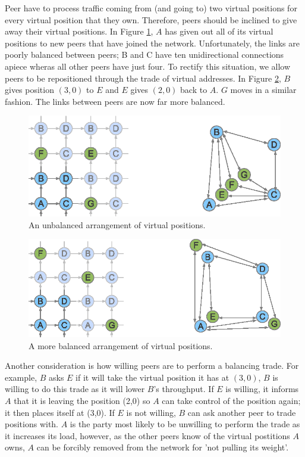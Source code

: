 \documentclass[ %
                    author={Luke Murray},
                supervisor={Dr. Simon Hollis},
                     title={Shadow Peer-to-Peer Networks},
                  subtitle={},
                    degree={MEng},
                      year={2013} ]{thesis}
\begin{document}
Peer have to process traffic coming from (and going to) two virtual positions for every virtual position that they own. Therefore, peers should be inclined to give away their virtual positions. In Figure \ref{balance1}, $A$ has given out all of its virtual positions to new peers that have joined the network. Unfortunately, the links are poorly balanced between peers; B and C have ten unidirectional connections apiece wheras all other peers have just four. To rectify this situation, we allow peers to be repositioned through the trade of virtual addresses. In Figure \ref{balance2}, $B$ gives position $(3,0)$ to $E$ and $E$ gives $(2,0)$ back to $A$. $G$ moves in a similar fashion. The links between peers are now far more balanced. 

\begin{figure}[h]
    \centering
    \includegraphics{diagrams/network_balance1.eps}
    \caption{An unbalanced arrangement of virtual positions.}
    \label{balance1}
\end{figure}
\begin{figure}[h]
    \centering
    \includegraphics{diagrams/network_balance2.eps}
    \caption{A more balanced arrangement of virtual positions.}
    \label{balance2}
\end{figure}

Another consideration is how willing peers are to perform a balancing trade. For example, $B$ asks $E$ if it will take the virtual position it has at $(3,0)$, $B$ is willing to do this trade as it will lower $B$'s throughput. If $E$ is willing, it informs $A$ that it is leaving the position (2,0) so $A$ can take control of the position again; it then places itself at (3,0). If $E$ is not willing, $B$ can ask another peer to trade positions with. $A$ is the party most likely to be unwilling to perform the trade as it increases its load, however, as the other peers know of the virtual postitions $A$ owns, $A$ can be forcibly removed from the network for 'not pulling its weight'.
\end{document}
